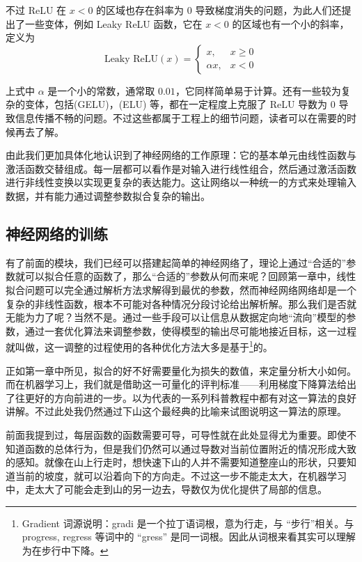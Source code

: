 不过 ReLU 在 $x<0$ 的区域也存在斜率为 $0$ 导致梯度消失的问题，为此人们还提出了一些变体，例如 Leaky ReLU 函数，它在 $x<0$ 的区域也有一个小的斜率，定义为
\[
    \text{Leaky ReLU}(x) = \begin{cases}
        x, & x \geq 0 \\
        \alpha x, & x < 0 
    \end{cases}
\]

上式中 $\alpha$ 是一个小的常数，通常取 $0.01$，它同样简单易于计算。还有一些较为复杂的变体，包括(GELU)，(ELU) 等，都在一定程度上克服了 ReLU 导数为 $0$ 导致信息传播不畅的问题。不过这些都属于工程上的细节问题，读者可以在需要的时候再去了解。

由此我们更加具体化地认识到了神经网络的工作原理：它的基本单元由线性函数与激活函数交替组成。每一层都可以看作是对输入进行线性组合，然后通过激活函数进行非线性变换以实现更复杂的表达能力。这让网络以一种统一的方式来处理输入数据，并有能力通过调整参数拟合复杂的输出。

\newpage

\subsection{神经网络的训练}

有了前面的模块，我们已经可以搭建起简单的神经网络了，理论上通过“合适的”参数就可以拟合任意的函数了，那么“合适的”参数从何而来呢？回顾第一章中，线性拟合问题可以完全通过解析方法求解得到最优的参数，然而神经网络网络却是一个复杂的非线性函数，根本不可能对各种情况分段讨论给出解析解。那么我们是否就无能为力了呢？当然不是。通过一些手段可以让信息从数据定向地“流向”模型的参数，通过一套优化算法来调整参数，使得模型的输出尽可能地接近目标，这一过程就叫做，这一调整的过程使用的各种优化方法大多是基于\footnote{Gradient 词源说明：gradi 是一个拉丁语词根，意为行走，与 “步行”相关。与 progress, regress 等词中的 “gress” 是同一词根。因此从词根来看其实可以理解为在步行中下降。}的。

正如第一章中所见，拟合的好不好需要量化为损失的数值，来定量分析大小如何。而在机器学习上，我们就是借助这一可量化的评判标准——利用梯度下降算法给出了往更好的方向前进的一步。以为代表的一系列科普教程中都有对这一算法的良好讲解。不过此处我仍然通过下山这个最经典的比喻来试图说明这一算法的原理。

前面我提到过，每层函数的函数需要可导，可导性就在此处显得尤为重要。即使不知道函数的总体行为，但是我们仍然可以通过导数对当前位置附近的情况形成大致的感知。就像在山上行走时，想快速下山的人并不需要知道整座山的形状，只要知道当前的坡度，就可以沿着向下的方向走。不过这一步不能走太大，在机器学习中，走太大了可能会走到山的另一边去，导数仅为优化提供了局部的信息。

